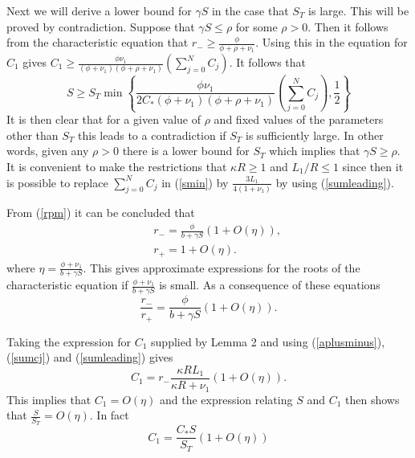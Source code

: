 \documentclass{article}
\begin{document}
Next we will derive a lower bound for $\gamma S$ in the case that $S_T$ is 
large. This will be proved by contradiction. Suppose that $\gamma S\le\rho$ 
for some $\rho>0$. Then it follows from the characteristic equation that
$r_-\ge\frac{\phi}{\phi+\rho+\nu_1}$. Using this in the equation for $C_1$ gives
$C_1\ge\frac{\phi\nu_1}{(\phi+\nu_1)(\phi+\rho+\nu_1)}
\left(\sum_{j=0}^NC_j\right)$. 
It follows that
\begin{equation}\label{smin}
S\ge S_T\min\left\{\frac{\phi\nu_1}{2C_*(\phi+\nu_1)(\phi+\rho+\nu_1)}
\left(\sum_{j=0}^NC_j\right),\frac12\right\}
\end{equation}
It is then clear that for a given value of $\rho$ and fixed values of the 
parameters other than $S_T$ this leads to a contradiction if $S_T$ is 
sufficiently large. In other words, given any $\rho>0$ there is a lower bound 
for $S_T$ which implies that $\gamma S\ge\rho$. It is convenient to make the 
restrictions that $\kappa R\ge 1$ and $L_1/R\le 1$ since then it is
possible to replace $\sum_{j=0}^NC_j$ in (\ref{smin}) by $\frac{3L_1}{4(1+\nu_1)}$
by using (\ref{sumleading}).

From (\ref{rpm}) it can be concluded that
\begin{eqnarray}
&&r_-=\frac{\phi}{b+\gamma S}(1+O(\eta)),\\
&&r_+=1+O(\eta).
\end{eqnarray}
where $\eta=\frac{\phi+\nu_1}{b+\gamma S}$.
This gives approximate expressions for the roots of the characteristic equation
if $\frac{\phi+\nu_1}{b+\gamma S}$ is small. As a consequence of these 
equations
\begin{equation}
\frac{r_-}{r_+}=\frac{\phi}{b+\gamma S}(1+O(\eta)).
\end{equation}

Taking the expression for $C_1$ supplied by Lemma 2 and using 
(\ref{aplusminus}), (\ref{sumcj}) and (\ref{sumleading}) gives
\begin{equation}
C_1=r_-\frac{\kappa RL_1}{\kappa R+\nu_1}(1+O(\eta)).
\end{equation}
This implies that $C_1=O(\eta)$ and the
expression relating $S$ and $C_1$ then shows that 
$\frac{S}{S_T}=O(\eta)$.
In fact 
\begin{equation}
C_1=\frac{C_*S}{S_T}(1+O(\eta))
\end{equation}
\end{document}

